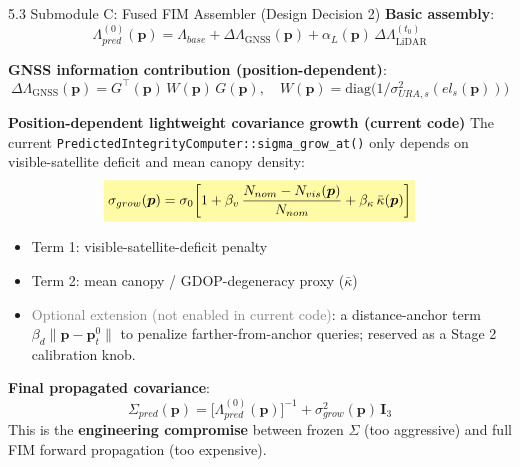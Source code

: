 \documentclass[10pt,aspectratio=169,xcolor=dvipsnames]{beamer}
\newcommand{\1}{\mathbb{1}}
\newcommand{\diag}{\mathrm{diag}}
\newcommand{\hlb}[1]{\colorbox{yellow!35}{\(\displaystyle #1\)}}
\newcommand{\innov}[1]{\textcolor{NavyBlue}{\textbf{#1}}}
\begin{document}
\begin{frame}{5.3 Submodule C: Fused FIM Assembler (Design Decision 2)}
  \small
  \textbf{Basic assembly}:
  \[
    \Lambda_{pred}^{(0)}(\bm{p})=\Lambda_{base}+\Delta\Lambda_{\mathrm{GNSS}}(\bm{p})+\alpha_L(\bm{p})\,\Delta\Lambda_{\mathrm{LiDAR}}^{(t_0)}
  \]

  \textbf{GNSS information contribution (position-dependent)}:
  \[
    \Delta\Lambda_{\mathrm{GNSS}}(\bm{p})=G^\top(\bm{p})\,W(\bm{p})\,G(\bm{p}),\quad
    W(\bm{p})=\diag\!\bigl(1/\sigma_{URA,s}^2(el_s(\bm{p}))\bigr)
  \]

  \medskip
  \begin{alertblock}{\small \innov{Position-dependent lightweight covariance growth (current code)}}
    \small
    The current \texttt{PredictedIntegrityComputer::sigma\_grow\_at()} only depends on visible-satellite deficit and mean canopy density:
    \[
      \hlb{
        \sigma_{grow}(\bm{p})=\sigma_0\!\left[1+\beta_v\,\frac{N_{nom}-N_{vis}(\bm{p})}{N_{nom}}+\beta_\kappa\,\bar{\kappa}(\bm{p})\right]
      }
    \]
    \scriptsize
    \begin{itemize}
      \item Term 1: visible-satellite-deficit penalty
      \item Term 2: mean canopy / GDOP-degeneracy proxy ($\bar\kappa$)
      \item \textcolor{gray}{Optional extension (not enabled in current code)}: a distance-anchor term $\beta_d\|\bm{p}-\bm{p}_t^0\|$ to penalize farther-from-anchor queries; reserved as a Stage 2 calibration knob.
    \end{itemize}
  \end{alertblock}

  \textbf{Final propagated covariance}:
  \[
    \Sigma_{pred}(\bm{p})=\bigl[\Lambda_{pred}^{(0)}(\bm{p})\bigr]^{-1}+\sigma_{grow}^2(\bm{p})\,\mathbf{I}_3
  \]
  This is the \textbf{engineering compromise} between frozen $\Sigma$ (too aggressive) and full FIM forward propagation (too expensive).
\end{frame}
\end{document}
